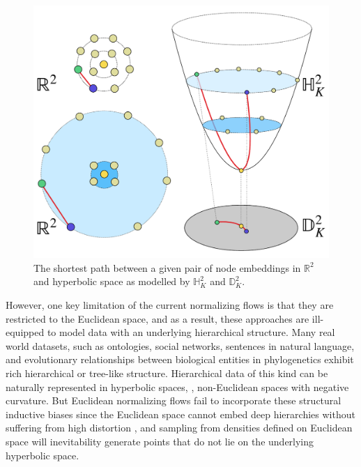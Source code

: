 \begin{figure}
    \centering
    \vspace{-10pt}
    \includegraphics[width=\linewidth]{explanatory_fig.pdf}
    \vspace{-10pt}
    \caption{The shortest path between a given pair of node embeddings in $\mathbb{R}^2$ and hyperbolic space as modelled by $\mathbb{H}^2_K$ and $\mathbb{D}^2_K$.}
    \vspace{-10pt}
    \label{fig:explanatory_fig_1}
\end{figure}

However, one key limitation of the current normalizing flows is that they are restricted to the Euclidean space, and as a result, these approaches are ill-equipped to model data with an underlying hierarchical structure. %
Many real world datasets, such as ontologies, social networks, sentences in natural language, and evolutionary relationships between biological entities in phylogenetics exhibit rich hierarchical or tree-like structure.
Hierarchical data of this kind can be naturally represented in hyperbolic spaces, \ie, non-Euclidean spaces with negative curvature. 
But Euclidean normalizing flows fail to incorporate these structural inductive biases since the Euclidean space cannot embed deep hierarchies without suffering from high distortion \cite{sarkar2011low}, and sampling from densities defined on Euclidean space will inevitability generate points that do not lie on the underlying hyperbolic space. 

